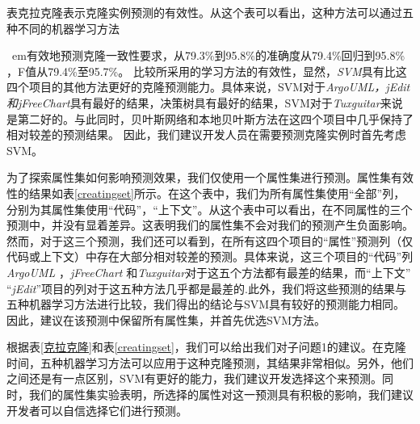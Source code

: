 {表{克拉克隆}表示克隆实例预测的有效性。从这个表可以看出，这种方法可以通过五种不同的机器学习方法{\ em有效地预测克隆一致性要求，从79.3\%到95.8\%的准确度从79.4\%回归到95.8\% ，F值从79.4\%至95.7\%。
比较所采用的学习方法的有效性，显然，{\em SVM}具有比这四个项目的其他方法更好的克隆预测能力。具体来说，SVM对于{\em ArgoUML，jEdit和jFreeChart}具有最好的结果，决策树具有最好的结果，SVM对于{\em Tuxguitar}来说是第二好的。与此同时，贝叶斯网络和本地贝叶斯方法在这四个项目中几乎保持了相对较差的预测结果。
因此，我们建议开发人员在需要预测克隆实例时首先考虑SVM。

为了探索属性集如何影响预测效果，我们仅使用一个属性集进行预测。属性集有效性的结果如表\ref{creatingset}所示。在这个表中，我们为所有属性集使用“全部”列，分别为其属性集使用“代码”，“上下文”。从这个表中可以看出，在不同属性的三个预测中，并没有显着差异。这表明我们的属性集不会对我们的预测产生负面影响。然而，对于这三个预测，我们还可以看到，在所有这四个项目的“属性”预测列（仅代码或上下文）中存在大部分相对较差的预测。具体来说，这三个项目的“代码”列{\em ArgoUML \/}，{\em jFreeChart \/}和{\em Tuxguitar}对于这五个方法都有最差的结果，而“上下文” “{\em jEdit}”项目的列对于这五种方法几乎都是最差的.此外，我们将这些预测的结果与五种机器学习方法进行比较，我们得出的结论与SVM具有较好的预测能力相同。因此，建议在该预测中保留所有属性集，并首先优选SVM方法。


根据表\ref{克拉克隆}和表\ref{creatingset}，我们可以给出我们对子问题1的建议。在克隆时间，五种机器学习方法可以应用于这种克隆预测，其结果非常相似。另外，他们之间还是有一点区别，SVM有更好的能力，我们建议开发选择这个来预测。同时，我们的属性集实验表明，所选择的属性对这一预测具有积极的影响，我们建议开发者可以自信选择它们进行预测。

}}
